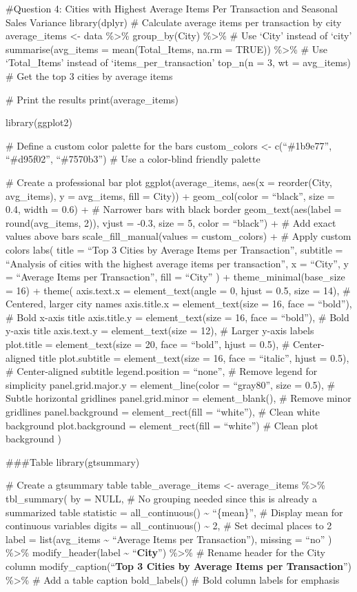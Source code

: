 \documentclass[
]{article}
\begin{document}
\#Question 4: Cities with Highest Average Items Per Transaction and
Seasonal Sales Variance library(dplyr) \# Calculate average items per
transaction by city average\_items \textless- data \%\textgreater\%
group\_by(City) \%\textgreater\% \# Use `City' instead of `city'
summarise(avg\_items = mean(Total\_Items, na.rm = TRUE))
\%\textgreater\% \# Use `Total\_Items' instead of
`items\_per\_transaction' top\_n(n = 3, wt = avg\_items) \# Get the top
3 cities by average items

\# Print the results print(average\_items)

library(ggplot2)

\# Define a custom color palette for the bars custom\_colors \textless-
c(``\#1b9e77'', ``\#d95f02'', ``\#7570b3'') \# Use a color-blind
friendly palette

\# Create a professional bar plot ggplot(average\_items, aes(x =
reorder(City, avg\_items), y = avg\_items, fill = City)) +
geom\_col(color = ``black'', size = 0.4, width = 0.6) + \# Narrower bars
with black border geom\_text(aes(label = round(avg\_items, 2)), vjust =
-0.3, size = 5, color = ``black'') + \# Add exact values above bars
scale\_fill\_manual(values = custom\_colors) + \# Apply custom colors
labs( title = ``Top 3 Cities by Average Items per Transaction'',
subtitle = ``Analysis of cities with the highest average items per
transaction'', x = ``City'', y = ``Average Items per Transaction'', fill
= ``City'' ) + theme\_minimal(base\_size = 16) + theme( axis.text.x =
element\_text(angle = 0, hjust = 0.5, size = 14), \# Centered, larger
city names axis.title.x = element\_text(size = 16, face = ``bold''), \#
Bold x-axis title axis.title.y = element\_text(size = 16, face =
``bold''), \# Bold y-axis title axis.text.y = element\_text(size = 12),
\# Larger y-axis labels plot.title = element\_text(size = 20, face =
``bold'', hjust = 0.5), \# Center-aligned title plot.subtitle =
element\_text(size = 16, face = ``italic'', hjust = 0.5), \#
Center-aligned subtitle legend.position = ``none'', \# Remove legend for
simplicity panel.grid.major.y = element\_line(color = ``gray80'', size =
0.5), \# Subtle horizontal gridlines panel.grid.minor =
element\_blank(), \# Remove minor gridlines panel.background =
element\_rect(fill = ``white''), \# Clean white background
plot.background = element\_rect(fill = ``white'') \# Clean plot
background )

\#\#\#Table library(gtsummary)

\# Create a gtsummary table table\_average\_items \textless-
average\_items \%\textgreater\% tbl\_summary( by = NULL, \# No grouping
needed since this is already a summarized table statistic =
all\_continuous() \textasciitilde{} ``\{mean\}'', \# Display mean for
continuous variables digits = all\_continuous() \textasciitilde{} 2, \#
Set decimal places to 2 label = list(avg\_items \textasciitilde{}
``Average Items per Transaction''), missing = ``no'' ) \%\textgreater\%
modify\_header(label \textasciitilde{} ``\textbf{City}'')
\%\textgreater\% \# Rename header for the City column
modify\_caption(``\textbf{Top 3 Cities by Average Items per
Transaction}'') \%\textgreater\% \# Add a table caption bold\_labels()
\# Bold column labels for emphasis
\end{document}
